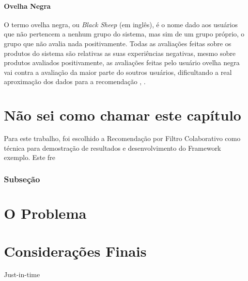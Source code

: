 \documentclass[12pt,
				openright,
				twoside,
				a4paper,
				apter=TITLE,
				section=TITLE,
				subsection=TITLE,
				chapter=TITLE,
				english,
				brazil]{abntex2}
\begin{document}
\subsubsection{Ovelha Negra}
O termo ovelha negra, ou \textit{Black Sheep} (em inglês), é o nome dado aos usuários que não pertencem a nenhum grupo do sistema, mas sim de um grupo próprio, o grupo que não avalia nada positivamente. Todas as avaliações feitas sobre os produtos do sistema são relativas as suas experiências negativas, mesmo sobre produtos avaliados positivamente, as avaliações feitas pelo usuário ovelha negra vai contra a avaliação da maior parte do soutros usuários, dificultando a real aproximação dos dados para a recomendação \cite{de2009preference}, \cite{su2009survey}. 

\chapter{Não sei como chamar este capítulo}
Para este trabalho, foi escolhido a Recomendação por Filtro Colaborativo como técnica para demostração de resultados e desenvolvimento do Framework exemplo. Este fre

\subsection{Subseção}


\chapter{O Problema}
\chapter{Considerações Finais}
Just-in-time



\end{document}
